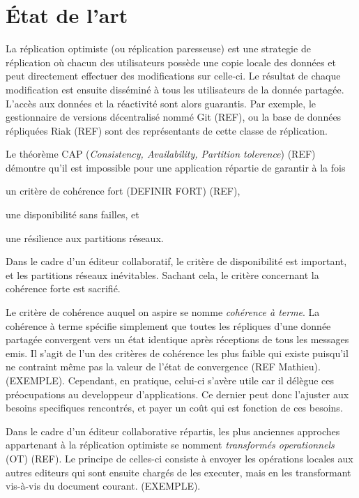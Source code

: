 \section{État de l'art}
\label{sec:relatedwork}


La réplication optimiste (ou réplication paresseuse) est une strategie de
réplication où chacun des utilisateurs possède une copie locale des données et
peut directement effectuer des modifications sur celle-ci. Le résultat de
chaque modification est ensuite disséminé à tous les utilisateurs de la donnée
partagée. L'accès aux données et la réactivité sont alors guarantis. Par
exemple, le gestionnaire de versions décentralisé nommé Git (REF), ou la base
de données répliquées Riak (REF) sont des représentants de cette classe de
réplication.

Le théorème CAP (\emph{Consistency, Availability, Partition tolerence}) (REF)
démontre qu'il est impossible pour une application répartie de garantir à la
fois
\begin{inparaenum}[(i)]
\item un critère de cohérence fort (DEFINIR FORT) (REF),
\item une disponibilité sans failles, et
\item une résilience aux partitions réseaux.
\end{inparaenum}
Dans le cadre d'un éditeur collaboratif, le critère de disponibilité est
important, et les partitions réseaux inévitables. Sachant cela, le critère
concernant la cohérence forte est sacrifié.

Le critère de cohérence auquel on aspire se nomme \emph{cohérence à terme}. La
cohérence à terme spécifie simplement que toutes les répliques d'une donnée
partagée convergent vers un état identique après réceptions de tous les
messages emis. Il s'agit de l'un des critères de cohérence les plus faible qui
existe puisqu'il ne contraint même pas la valeur de l'état de convergence (REF
Mathieu). (EXEMPLE). Cependant, en pratique, celui-ci s'avère utile car il
délègue ces préocupations au developpeur d'applications. Ce dernier peut donc
l'ajuster aux besoins specifiques rencontrés, et payer un coût qui est fonction
de ces besoins.

Dans le cadre d'un éditeur collaborative répartis, les plus anciennes approches
appartenant à la réplication optimiste se nomment \emph{transformés
  operationnels} (OT) (REF). Le principe de celles-ci consiste à envoyer les
opérations locales aux autres editeurs qui sont ensuite chargés de les
executer, mais en les transformant vis-à-vis du document courant. (EXEMPLE).


